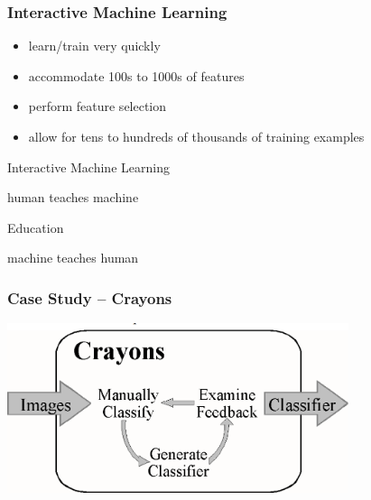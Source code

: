\documentclass[xcolor=svgnames]{beamer}
\begin{document}
\begin{frame}
	\frametitle{Interactive Machine Learning}
	\begin{itemize}
		\item learn/train very quickly
		\item accommodate 100s to 1000s of features
		\item	perform feature selection
		\item allow for tens to hundreds of thousands of training examples
	\end{itemize}
\end{frame}
\begin{frame}
	\begin{center}
		{\Huge Interactive Machine Learning}

		\medskip
		human teaches machine

		\bigskip
		\bigskip
		\bigskip
		\bigskip

		{\Huge Education}

		\medskip
		machine teaches human
	\end{center}
\end{frame}
\begin{frame}
	\frametitle{Case Study -- Crayons}
	\begin{center}
		\includegraphics[width=0.75\textwidth]{2013-IA080-interactive-machine-learning/crayons-diagram.png}
	\end{center}
\end{frame}
\end{document}

